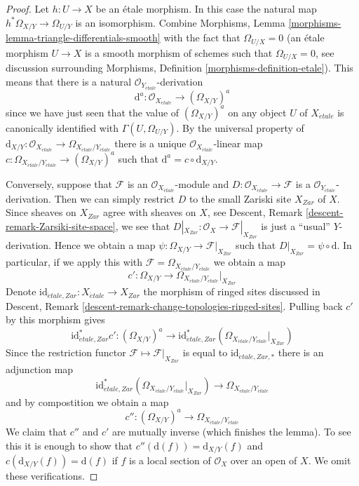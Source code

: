 \begin{proof}
Let $h : U \to X$ be an \'etale morphism. In this case the natural map
$h^*\Omega_{X/Y} \to \Omega_{U/Y}$ is an isomorphism. Combine
Morphisms, Lemma \ref{morphisms-lemma-triangle-differentials-smooth}
with the fact that $\Omega_{U/X} = 0$ (an \'etale morphism $U \to X$
is a smooth morphism of schemes such that $\Omega_{U/X} = 0$,
see discussion surrounding
Morphisms, Definition \ref{morphisms-definition-etale}).
This means that there is a natural $\mathcal{O}_{Y_{\acute{e}tale}}$-derivation
$$
\text{d}^a : \mathcal{O}_{X_{\acute{e}tale}} \longrightarrow (\Omega_{X/Y})^a
$$
since we have just seen that the value of $(\Omega_{X/Y})^a$ on any object
$U$ of $X_{\acute{e}tale}$ is canonically identified with
$\Gamma(U, \Omega_{U/Y})$. By the universal property of
$\text{d}_{X/Y} :
\mathcal{O}_{X_{\acute{e}tale}}
\to
\Omega_{X_{\acute{e}tale}/Y_{\acute{e}tale}}$
there is a unique $\mathcal{O}_{X_{\acute{e}tale}}$-linear map
$c : \Omega_{X_{\acute{e}tale}/Y_{\acute{e}tale}} \to (\Omega_{X/Y})^a$
such that
$\text{d}^a = c \circ \text{d}_{X/Y}$.

\medskip\noindent
Conversely, suppose that $\mathcal{F}$ is an
$\mathcal{O}_{X_{\acute{e}tale}}$-module
and $D : \mathcal{O}_{X_{\acute{e}tale}} \to \mathcal{F}$ is a
$\mathcal{O}_{Y_{\acute{e}tale}}$-derivation. Then we can simply restrict
$D$ to the small Zariski site $X_{Zar}$ of $X$. Since sheaves on $X_{Zar}$
agree with sheaves on $X$, see
Descent, Remark \ref{descent-remark-Zarsiki-site-space},
we see that $D|_{X_{Zar}} : \mathcal{O}_X \to \mathcal{F}|_{X_{Zar}}$
is just a ``usual'' $Y$-derivation. Hence we obtain a map
$\psi : \Omega_{X/Y} \longrightarrow \mathcal{F}|_{X_{Zar}}$
such that $D|_{X_{Zar}} = \psi \circ \text{d}$. In particular, if we
apply this with $\mathcal{F} = \Omega_{X_{\acute{e}tale}/Y_{\acute{e}tale}}$
we obtain a map
$$
c' :
\Omega_{X/Y}
\longrightarrow
\Omega_{X_{\acute{e}tale}/Y_{\acute{e}tale}}|_{X_{Zar}}
$$
Denote $\text{id}_{\acute{e}tale, Zar} : X_{\acute{e}tale} \to X_{Zar}$
the morphism of ringed sites discussed in
Descent, Remark \ref{descent-remark-change-topologies-ringed-sites}.
Pulling back $c'$ by this morphism gives
$$
\text{id}_{\acute{e}tale, Zar}^*c' :
(\Omega_{X/Y})^a
\longrightarrow
\text{id}_{\acute{e}tale, Zar}^*\left(
\Omega_{X_{\acute{e}tale}/Y_{\acute{e}tale}}|_{X_{Zar}}\right)
$$
Since the restriction functor $\mathcal{F} \mapsto \mathcal{F}|_{X_{Zar}}$
is equal to $\text{id}_{\acute{e}tale, Zar, *}$ there is an adjunction map
$$
\text{id}_{\acute{e}tale, Zar}^*\left(
\Omega_{X_{\acute{e}tale}/Y_{\acute{e}tale}}|_{X_{Zar}}\right)
\longrightarrow
\Omega_{X_{\acute{e}tale}/Y_{\acute{e}tale}}
$$
and by compostition we obtain a map
$$
c'' :
(\Omega_{X/Y})^a
\longrightarrow
\Omega_{X_{\acute{e}tale}/Y_{\acute{e}tale}}
$$
We claim that $c''$ and $c'$ are mutually inverse (which finishes the lemma).
To see this it is enough to show that $c''(\text{d}(f)) = \text{d}_{X/Y}(f)$
and $c(\text{d}_{X/Y}(f)) = \text{d}(f)$ if $f$ is a local section of
$\mathcal{O}_X$ over an open of $X$. We omit these verifications.
\end{proof}

